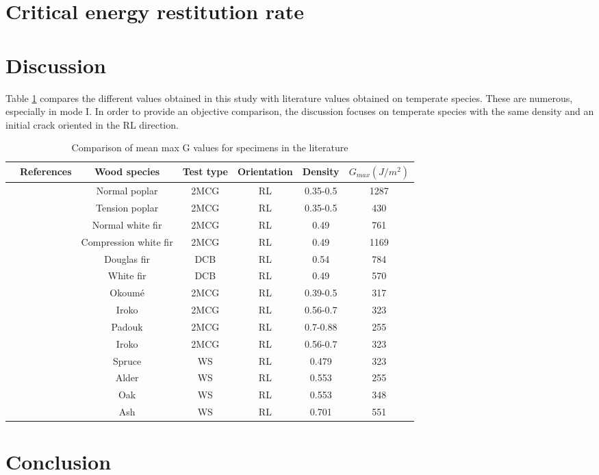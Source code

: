 \section{Critical energy restitution rate}

\section{Discussion}

Table \ref{fig:fig37} compares the different values obtained in this study with literature values obtained on temperate species. These are numerous, especially in mode I. In order to provide an objective comparison, the discussion focuses on temperate species with the same density and an initial crack oriented in the RL direction.


\begin{table} \centering
	\begin{tabular}{ccccccc}
		\toprule %
		& References & Wood species & Test type & Orientation & Density & $G_{max}(J/m^2)$\\\midrule
		& \cite{Mambili2018} & Normal poplar & 2MCG & RL & 0.35-0.5 & 1287\\\midrule
		& \cite{Mambili2018} & Tension poplar & 2MCG & RL & 0.35-0.5 & 430\\\midrule
		& \cite{Mambili2018} & Normal white fir & 2MCG & RL & 0.49 & 761\\\midrule
		& \cite{Mambili2018} & Compression white fir & 2MCG & RL  & 0.49 & 1169\\\midrule
		& \cite{Angellier2017} & Douglas fir & DCB & RL  & 0.54 & 784\\\midrule
		& \cite{Angellier2017} & White fir & DCB & RL  & 0.49 & 570\\\midrule
		& \cite{Odounga2018phd} & Okoumé & 2MCG & RL & 0.39-0.5 & 317\\\midrule
		& \cite{Odounga2018phd} & Iroko & 2MCG & RL & 0.56-0.7 & 323\\\midrule
		& \cite{Odounga2018phd} & Padouk & 2MCG & RL & 0.7-0.88 & 255\\\midrule
		& \cite{Odounga2018phd} & Iroko & 2MCG & RL & 0.56-0.7 & 323\\\midrule
		& \cite{Reiterer2002} & Spruce & WS & RL & 0.479 & 323\\\midrule
		& \cite{Reiterer2002} & Alder & WS & RL & 0.553 & 255\\\midrule
		& \cite{Reiterer2002} & Oak & WS & RL & 0.553 & 348\\\midrule
		& \cite{Reiterer2002} & Ash & WS & RL & 0.701 & 551\\
		\bottomrule %
	\end{tabular}
	\caption{Comparison of mean max G values for specimens in the literature}
	\label{fig:fig37}
\end{table}

\section{Conclusion}